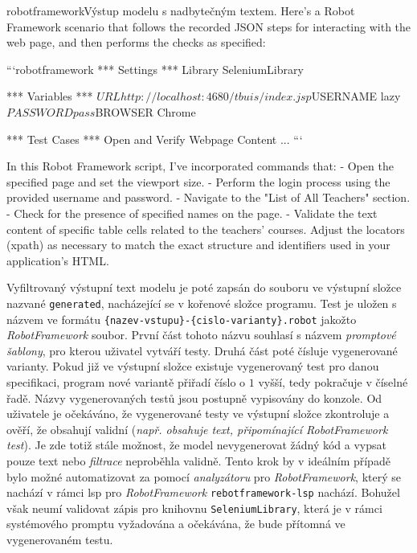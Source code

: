 \documentclass[czech, ma, kiv, he, iso690numb, pdf, viewonly]{fasthesis}
\begin{document}
        \begin{code}{robotframework}{Výstup modelu s nadbytečným textem. \label{lst:text_around}}
Here's a Robot Framework scenario that follows the recorded JSON steps for interacting with the web page, and then performs the checks as specified:

```robotframework
*** Settings ***
Library           SeleniumLibrary

*** Variables ***
${URL}            http://localhost:4680/tbuis/index.jsp
${USERNAME}       lazy
${PASSWORD}       pass
${BROWSER}        Chrome

*** Test Cases ***
Open and Verify Webpage Content
...
```

In this Robot Framework script, I've incorporated commands that:
- Open the specified page and set the viewport size.
- Perform the login process using the provided username and password.
- Navigate to the "List of All Teachers" section.
- Check for the presence of specified names on the page.
- Validate the text content of specific table cells related to the teachers' courses.
Adjust the locators (xpath) as necessary to match the exact structure and identifiers used in your application's HTML.
        \end{code}

        Vyfiltrovaný výstupní text modelu je poté zapsán do souboru ve výstupní složce nazvané \verb|generated|, nacházející se v kořenové složce programu. Test je uložen s názvem ve formátu \verb|{nazev-vstupu}-{cislo-varianty}.robot| jakožto \textit{RobotFramework} soubor. První část tohoto názvu souhlasí s názvem \textit{promptové šablony}, pro kterou uživatel vytváří testy. Druhá část poté čísluje vygenerované varianty. Pokud již ve výstupní složce existuje vygenerovaný test pro danou specifikaci, program nové variantě přiřadí číslo o \(1\) vyšší, tedy pokračuje v číselné řadě. Názvy vygenerovaných testů jsou postupně vypisovány do konzole. Od uživatele je očekáváno, že vygenerované testy ve výstupní složce zkontroluje a ověří, že obsahují validní (\textit{např. obsahuje text, připomínající RobotFramework test}). Je zde totiž stále možnost, že model nevygenerovat žádný kód a vypsat pouze text nebo \textit{filtrace} neproběhla validně. Tento krok by v ideálním případě bylo možné automatizovat za pomocí \textit{analyzátoru} pro \textit{RobotFramework}, který se nachází v rámci \Gls{lsp} pro \textit{RobotFramework} \verb|rebotframework-lsp| nachází. Bohužel však neumí validovat zápis pro knihovnu \verb|SeleniumLibrary|, která je v rámci systémového promptu vyžadována a očekávána, že bude přítomná ve vygenerovaném testu.
\end{document}
